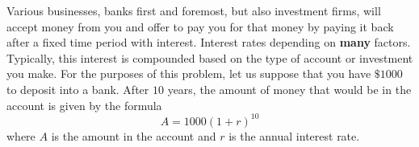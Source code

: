 \documentclass[addpoints, 12pt] {exam}
\begin{document}
\begin{questions}
\question
{}
\newpage
\question Various businesses, banks first and foremost, but also investment firms, will accept money from you and offer to pay you for that money by paying it back after a fixed time period with interest. Interest rates depending on {\bf many} factors. Typically, this interest is compounded based on the type of account or investment you make. For the purposes of this problem, let us suppose that you have \(\$1000\) to deposit into a bank. After \(10\) years, the amount of money that would be in the account is given by the formula 
\[A=1000(1+r)^{10}\]where \(A\) is the amount in the account and \(r\) is the annual interest rate. 
\end{questions}
\end{document}
